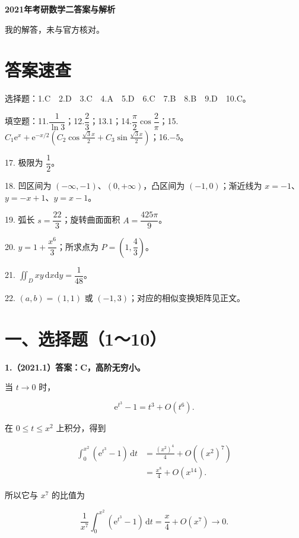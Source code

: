 \documentclass[UTF8,11pt,fontset=windows]{ctexart}
\begin{document}
{\LARGE\bfseries 2021年考研数学二答案与解析\par}\vspace{6pt}

\begingroup\color{gray}我的解答，未与官方核对。\par\endgroup

\section*{答案速查}

\begingroup\color{gray}选择题：1.C　2.D　3.C　4.A　5.D　6.C　7.B　8.B　9.D　10.C。\par\endgroup

\begingroup\color{gray}填空题：11.$\dfrac1{\ln3}$；12.$\dfrac23$；13.$1$；14.$\dfrac\pi2\cos\dfrac2\pi$；15.$C_1\mathrm e^x+\mathrm e^{-x/2}(C_2\cos\frac{\sqrt3x}{2}+C_3\sin\frac{\sqrt3x}{2})$；16.$-5$。\par\endgroup

17. 极限为 $\dfrac12$。

18. 凹区间为 $(-\infty,-1)$、$(0,+\infty)$，凸区间为 $(-1,0)$；渐近线为 $x=-1$、$y=-x+1$、$y=x-1$。

19. 弧长 $s=\dfrac{22}{3}$；旋转曲面面积 $A=\dfrac{425\pi}{9}$。

20. $y=1+\dfrac{x^6}{3}$；所求点为 $P=(1,\dfrac43)$。

21. $\iint_Dxy\,\mathrm dx\mathrm dy=\dfrac1{48}$。

22. $(a,b)=(1,1)$ 或 $(-1,3)$；对应的相似变换矩阵见正文。

\clearpage

\section*{一、选择题（1～10）}

\textbf{1.（2021.1）答案：C，高阶无穷小。}

当 $t\to0$ 时，

$$
\mathrm e^{t^3}-1=t^3+O(t^6).
$$

在 $0\le t\le x^2$ 上积分，得到

$$
\begin{aligned}
\int_0^{x^2}(\mathrm e^{t^3}-1)\,\mathrm dt
&=\frac{(x^2)^4}{4}+O((x^2)^7)\\
&=\frac{x^8}{4}+O(x^{14}).
\end{aligned}
$$

所以它与 $x^7$ 的比值为

$$
\frac1{x^7}\int_0^{x^2}(\mathrm e^{t^3}-1)\,\mathrm dt
=\frac x4+O(x^7)\longrightarrow0.
$$
\end{document}
